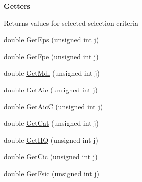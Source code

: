 \begin{Indent}\textbf{ Getters}\par
{\em \begin{DoxyReturn}{Returns}
values for selected selection criteria 
\end{DoxyReturn}
}\begin{DoxyCompactItemize}
\item 
double \hyperlink{classtsa_1_1_selection_order_criteria_aeb60448670ad981aca76e9a72816c529}{Get\+Eps} (unsigned int j)
\item 
double \hyperlink{classtsa_1_1_selection_order_criteria_a576439d71bf4a7e567c540c4f1eabf40}{Get\+Fpe} (unsigned int j)
\item 
double \hyperlink{classtsa_1_1_selection_order_criteria_a2756d71a6b56eba01538e54fa71f5cce}{Get\+Mdl} (unsigned int j)
\item 
double \hyperlink{classtsa_1_1_selection_order_criteria_add034262822c903dfd6d52b00e014c07}{Get\+Aic} (unsigned int j)
\item 
double \hyperlink{classtsa_1_1_selection_order_criteria_a8ccfe952a0ef4d2b60e0e6a968abc439}{Get\+AicC} (unsigned int j)
\item 
double \hyperlink{classtsa_1_1_selection_order_criteria_a3e273fa404fe97a0479c7fc43a510801}{Get\+Cat} (unsigned int j)
\item 
double \hyperlink{classtsa_1_1_selection_order_criteria_a7dd080dd100b191e8b1638d15019c175}{Get\+HQ} (unsigned int j)
\item 
double \hyperlink{classtsa_1_1_selection_order_criteria_aaa56b262fea6a0c8081c92b408f83754}{Get\+Cic} (unsigned int j)
\item 
double \hyperlink{classtsa_1_1_selection_order_criteria_a6cd4473ff39d1ef44384cbd3dd2ee9c6}{Get\+Fsic} (unsigned int j)
\end{DoxyCompactItemize}
\end{Indent}
